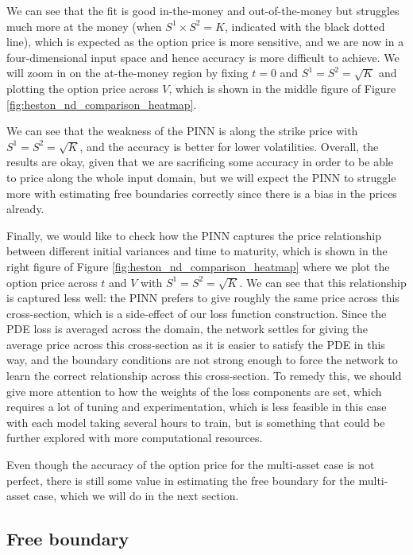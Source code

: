 We can see that the fit is good in-the-money and out-of-the-money but struggles much more at the money (when $S^1 \times S^2 = K$, indicated with the black dotted line), which is expected as the option price is more sensitive, and we are now in a four-dimensional input space and hence accuracy is more difficult to achieve. We will zoom in on the at-the-money region by fixing $t=0$ and $S^1=S^2=\sqrt{K}$ and plotting the option price across $V$, which is shown in the middle figure of Figure \ref{fig:heston_nd_comparison_heatmap}.

We can see that the weakness of the PINN is along the strike price with $S^1=S^2=\sqrt{K}$, and the accuracy is better for lower volatilities. Overall, the results are okay, given that we are sacrificing some accuracy in order to be able to price along the whole input domain, but we will expect the PINN to struggle more with estimating free boundaries correctly since there is a bias in the prices already.

Finally, we would like to check how the PINN captures the price relationship between different initial variances and time to maturity, which is shown in the right figure of Figure \ref{fig:heston_nd_comparison_heatmap} where we plot the option price across $t$ and $V$ with $S^1=S^2=\sqrt{K}$. We can see that this relationship is captured less well: the PINN prefers to give roughly the same price across this cross-section, which is a side-effect of our loss function construction. Since the PDE loss is averaged across the domain, the network settles for giving the average price across this cross-section as it is easier to satisfy the PDE in this way, and the boundary conditions are not strong enough to force the network to learn the correct relationship across this cross-section. To remedy this, we should give more attention to how the weights of the loss components are set, which requires a lot of tuning and experimentation, which is less feasible in this case with each model taking several hours to train, but is something that could be further explored with more computational resources.

Even though the accuracy of the option price for the multi-asset case is not perfect, there is still some value in estimating the free boundary for the multi-asset case, which we will do in the next section.

\subsection{Free boundary}

